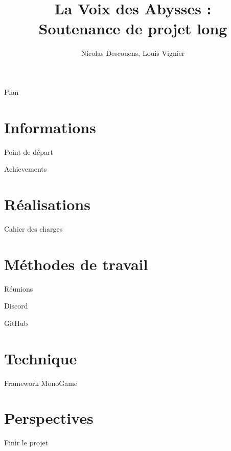 \documentclass{beamer}
\title{La Voix des Abysses :\\Soutenance de projet long}
\author{Nicolas Descouens, Louis Vignier}
\institute{CentraleSupélec}
\begin{document}
\begin{frame}
  \titlepage
\end{frame}

\begin{frame}{Plan}
  \tableofcontents
\end{frame}

\section{Informations}

\begin{frame}{Point de départ}
  
\end{frame}

\begin{frame}{Achievements}
  
\end{frame}

\section{Réalisations}

\begin{frame}{Cahier des charges}
  
\end{frame}

\section{Méthodes de travail}

\begin{frame}{Réunions}
  
\end{frame}

\begin{frame}{Discord}
  
\end{frame}

\begin{frame}{GitHub}
  
\end{frame}

\section{Technique}

\begin{frame}{Framework MonoGame}
  
\end{frame}

\section{Perspectives}

\begin{frame}{Finir le projet}
  
\end{frame}
\end{document}
